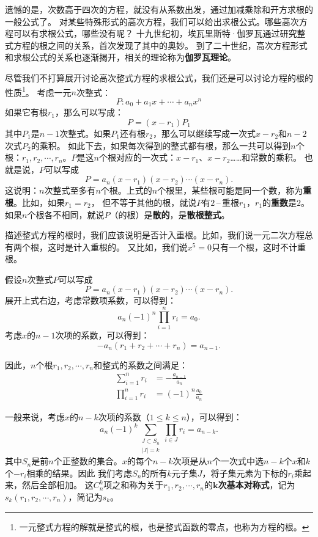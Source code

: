 \documentclass[12pt,UTF8]{ctexbook}
\theoremstyle{definition}
\theoremstyle{plain}
\begin{document}
遗憾的是，次数高于四次的方程，就没有从系数出发，通过加减乘除和开方求根的一般公式了。
对某些特殊形式的高次方程，我们可以给出求根公式。哪些高次方程可以有求根公式，哪些没有呢？
十九世纪初，埃瓦里斯特·伽罗瓦通过研究整式方程的根之间的关系，首次发现了其中的奥妙。
到了二十世纪，高次方程形式和求根公式的关系也逐渐揭开，相关的理论称为\textbf{伽罗瓦理论}。

尽管我们不打算展开讨论高次整式方程的求根公式，我们还是可以讨论方程的根的性质\footnote{一元整式方程的解就是整式的根，也是整式函数的零点，也称为方程的根。}。
考虑一元$n$次整式：
$$ P: a_0 + a_1 x + \cdots + a_n x^n $$
如果它有根$r_1$，那么可以写成：
$$ P = (x - r_1) P_1$$
其中$P_1$是$n-1$次整式。如果$P_1$还有根$r_2$，那么可以继续写成一次式$x - r_2$和$n-2$次式$P_2$的乘积。
如此下去，如果每次得到的整式都有根，那么一共可以得到$n$个根：$r_1, r_2, \cdots , r_n$。$P$是这$n$个根对应的一次式：$x - r_1$、$x - r_2$……和常数的乘积。
也就是说，$P$可以写成
$$ P = a_n (x - r_1)(x - r_2)\cdots (x - r_n).$$
这说明：$n$次整式至多有$n$个根。上式的$n$个根里，某些根可能是同一个数，称为\textbf{重根}。比如，如果$r_1 = r_2$，
但不等于其他的根，就说$P$有$2$\,–\,重根$r_1$，$r_1$的\textbf{重数}是$2$。如果$n$个根各不相同，就说$P$（的根）是\textbf{散的}，是\textbf{散根整式}。

描述整式方程的根时，我们应该说明是否计入重根。比如，我们说一元二次方程总有两个根，这时是计入重根的。
又比如，我们说$x^5 = 0$只有一个根，这时不计重根。

假设$n$次整式$P$可以写成
$$ P = a_n (x - r_1)(x - r_2)\cdots (x - r_n).$$
展开上式右边，考虑常数项系数，可以得到：
$$ a_n (-1)^n \prod_{i=1}^n r_i = a_0.$$
考虑$x$的$n-1$次项的系数，可以得到：
$$ - a_n (r_1 + r_2 + \cdots + r_n) = a_{n-1}. $$

因此，$n$个根$r_1, r_2, \cdots , r_n$和整式的系数之间满足：
\begin{align*}
    \sum_{i=1}^n r_i &= -\frac{a_{n-1}}{a_n} \\
    \prod_{i=1}^n r_i &= (-1)^n \frac{a_0}{a_n}
\end{align*}

一般来说，考虑$x$的$n-k$次项的系数（$1\leqslant k \leqslant n$），可以得到：
$$ a_n (-1)^k \sum_{\substack{J\subset S_n\\|J|=k}} \prod_{i\in J}r_{i} = a_{n-k}. $$
其中$S_n$是前$n$个正整数的集合。$x$的每个$n-k$次项是从$n$个一次式中选$n-k$个$x$和$k$个$-r_i$相乘的结果。因此
我们考虑$S_n$的所有$k$元子集$J$，将子集元素为下标的$r_i$乘起来，然后全部相加。
这$C_n^k$项之和称为关于$r_1, r_2, \cdots , r_n$的$\boldsymbol{k}$\textbf{次基本对称式}，记为$s_{k}(r_1, r_2, \cdots , r_n)$，简记为$s_k$。
\end{document}
